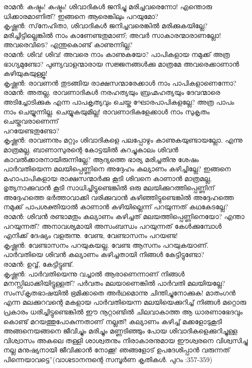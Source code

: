 രാമന്‍: കഷ്ടം! കഷ്ടം! ശിവാദികള്‍ ജനിച്ചു മരിച്ചവരെന്നോ! എന്തൊരു ധിക്കാരമാണിത്? ഇങ്ങനെ ആരെങ്കിലും പറയുമോ?\\
കൃഷ്ണന്‍: സ്‌നേഹിതാ, ശിവാദികള്‍ ജനിച്ചവരെങ്കില്‍ മരിക്കുകയില്ലേ? മരിച്ചിട്ടില്ലെങ്കില്‍ നാം കാണേണ്ടതുമാണ്; അവര്‍ സാകാരന്മാരാണല്ലോ! അവരെവിടെ? എന്തുകൊണ്ട് കാണുന്നില്ല?\\
രാമന്‍: ശിവ! ശിവ! അവരെ നാം കാണുകയോ? പാപികളായ നമുക്ക് അത്ര ഭാഗ്യമുണ്ടോ? പുണ്യവാളന്മാരായ സജ്ജനങ്ങള്‍ക്കു മാത്രമേ അവരെക്കാണാന്‍ കഴിയുകയുള്ളൂ!\\
കൃഷ്ണന്‍: രാവണന്‍ തുടങ്ങിയ രാക്ഷസന്മാരേക്കാള്‍ നാം പാപികളാണെന്നോ?\\
രാമന്‍: അതല്ല, രാവണാദികള്‍ നരഹത്യയും ബ്രഹ്മഹത്യയും ദേവന്മാരെ അടിച്ചോടിക്കുക എന്ന പാപകൃത്യവും ചെയ്ത ഘോരപാപികളല്ലേ? അത്ര പാപം നാം ചെയ്യുന്നില്ല. ചെയ്യുകയുമില്ല! രാവണാദികളേക്കാള്‍ നാം സുകൃതം ചെയ്തവരാണെന്ന്\\ പറയേണ്ടതുണ്ടോ?\\
കൃഷ്ണന്‍: രാവണനും മറ്റും ശിവാദികളെ പലപ്പോഴും കാണുകയുണ്ടായല്ലോ. എന്നു മാത്രമല്ല, ബാണാസുരന്റെ കോട്ടയില്‍ കുറച്ചുകാലം ശിവന്‍ കാവല്‍ക്കാരനായിരുന്നില്ലേ? ആദ്യത്തെ ഭാര്യ മരിച്ചതിനു ശേഷം പാര്‍വതിയെന്ന മലയിപ്പെണ്ണിനെ അദ്ദേഹം കല്യാണം കഴിച്ചില്ലേ? ഇങ്ങനെ മഹാപാപികളായ രാക്ഷസന്മാര്‍ക്കു കൂടി ശിവനെ കാണാന്‍ മാത്രമല്ല, ഭൃത്യനാക്കുവാന്‍ കൂടി സാധിച്ചിട്ടുണ്ടെങ്കില്‍ ഒരു മലയിക്കുറത്തിപ്പെണ്ണിന് അദ്ദേഹത്തെ ഭര്‍ത്താവാക്കി വരിക്കുവാന്‍ കഴിഞ്ഞിട്ടുണ്ടെങ്കില്‍ അദ്ദേഹത്തെ നമുക്ക് പാപശക്തിയാല്‍ കാണാന്‍ കഴിയില്ലെന്ന് പറയുന്നത് കഥകേടല്ലേ?\\
രാമന്‍: ശിവന്‍ രണ്ടാമതും കല്യാണം കഴിച്ചത് മലയത്തിപ്പെണ്ണിനെയോ? എന്താ പറയുന്നത്? അനാവശ്യമായി അസംബന്ധം പറയുന്നത് കേള്‍ക്കുമ്പോള്‍ എനിക്ക് ദേഷ്യം വളരുന്നു. വേണ്ട, വേണ്ടാസനം പറയണ്ട!\\
കൃഷ്ണന്‍: വേണ്ടാസനം പറയുകയല്ല. വേണ്ട ആസനം പറയുകയാണ്. പാര്‍വതിയെ ശിവന്‍ കല്യാണം കഴിച്ചതായി നിങ്ങള്‍ കേട്ടിട്ടുണ്ടോ?\\
രാമന്‍: ഉവ്വ്, കേട്ടിട്ടുണ്ട്.\\
കൃഷ്ണന്‍: പാര്‍വതിയെന്നു വച്ചാല്‍ ആരാണെന്നാണ് നിങ്ങള്‍ മനസ്സിലാക്കിയിട്ടുള്ളത്? പര്‍വതം മലയാണെങ്കില്‍ പാര്‍വതി മലയിയല്ലേ? സംസ്‌കൃതഭാഷയില്‍ ഭ്രമിക്കാതെ അര്‍ഥമൊന്നു ചിന്തിച്ചുനോക്കുക! മാതംഗന്‍ എന്ന മലക്കുറവന്റെ മകളായ പാര്‍വതിയെന്ന മലയിയെക്കുറിച്ച് നിങ്ങള്‍ മറ്റൊരു പ്രകാരം ധരിച്ചിട്ടുണ്ടെങ്കില്‍ ഈ നൂറ്റാണ്ടില്‍ ചിലവാകാത്ത ആ ധാരണാഭേദവും കൊണ്ട് മറയത്തുപോകുന്നതാണ് നല്ലത്! കല്യാണം കഴിച്ച് മക്കളോടുകൂടി അങ്ങനെയങ്ങനെ ജീവിച്ചും മരിച്ചും മണ്ണടിഞ്ഞും പോയ ശിവാദികളെക്കുറിച്ചുള്ള വിശ്വാസം അകലെ തള്ളി ശാശ്വതനും നിരാകാരനുമായ ഈശ്വരനെ വിശ്വസിച്ചു നല്ല മനുഷ്യനായി ജീവിക്കാന്‍ നോക്കൂ! ഞങ്ങളോട് ഉപദേശിപ്പാന്‍ വരുന്നത് പിന്നെയാവട്ടെ''(വാഗ്ഭടാനന്ദന്റെ സമ്പൂര്‍ണ കൃതികള്‍. പുറം :357-359)\\

